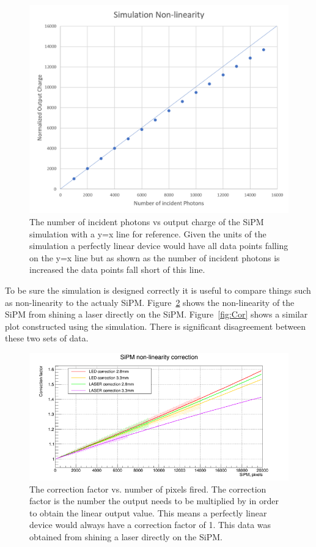 \begin{figure}
\centering
\includegraphics[width=0.8\linewidth]{Figures/SimNon.png}
\caption{The number of incident photons vs output charge of the SiPM simulation with a y=x line for reference. Given the units of the simulation a perfectly linear device would have all data points falling on the y=x line but as shown as the number of incident photons is increased the data points fall short of this line.}
\label{fig:SimNon}
\end{figure}

To be sure the simulation is designed correctly it is useful to compare things such as non-linearity to the actualy SiPM. Figure~\ref{fig:NonLin} shows the non-linearity of the SiPM from shining a laser directly on the SiPM. Figure~\ref{fig:Cor} shows a similar plot constructed using the simulation. There is significant disagreement between these two sets of data.

\begin{figure}
\centering
\includegraphics[width=\linewidth]{Figures/LaserNonLin.png}
\caption{The correction factor vs. number of pixels fired. The correction factor is the number the output needs to be multiplied by in order to obtain the linear output value. This means a perfectly linear device would always have a correction factor of 1. This data was obtained from shining a laser directly on the SiPM.}
\label{fig:NonLin}
\end{figure}

